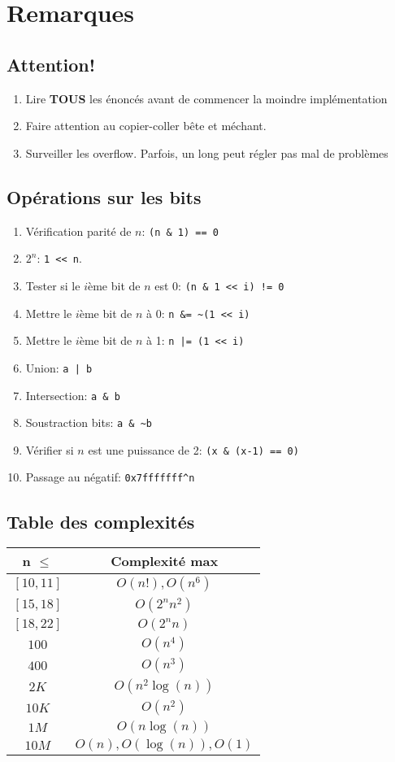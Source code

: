 \section{Remarques}
\subsection{Attention!}
\begin{enumerate}
	\item Lire \textbf{TOUS} les énoncés avant de commencer la moindre implémentation
	\item Faire attention au copier-coller bête et méchant.
	\item Surveiller les overflow. Parfois, un long peut régler pas mal de problèmes
\end{enumerate}
 
\subsection{Opérations sur les bits}
\begin{enumerate}
	\item Vérification parité de $n$: \lstinline{(n & 1) == 0}
	\item $2^n$: \lstinline|1 << n|.
	\item Tester si le $i$ème bit de $n$ est $0$: \lstinline{(n & 1 << i) != 0}
	\item Mettre le $i$ème bit de $n$ à 0: \lstinline{n &= ~(1 << i)}
	\item Mettre le $i$ème bit de $n$ à 1: \lstinline{n |= (1 << i)}
	\item Union: \lstinline{a | b}
	\item Intersection: \lstinline{a & b}
	\item Soustraction bits: \lstinline{a & ~b}
	\item Vérifier si $n$ est une puissance de 2: \lstinline{(x & (x-1) == 0)}
	\item Passage au négatif: \lstinline{0x7fffffff^n}
\end{enumerate}

\subsection{Table des complexités}
\begin{center}
\begin{tabular}{|c|c|}
\hline
n $\leq$ & Complexité max\\
\hline
$[10,11]$ & $O(n!),O(n^6)$ \\
$[15,18]$ & $O(2^n n^2)$\\
$[18,22]$ & $O(2^n n)$\\
$100$ & $O(n^4)$\\
$400$ & $O(n^3)$\\
$2K$ & $O(n^2\log(n))$\\
$10K$ & $O(n^2)$\\
$1M$ & $O(n\log(n))$\\
$10M$ & $O(n),O(\log(n)),O(1)$\\
\hline
\end{tabular}
\end{center}